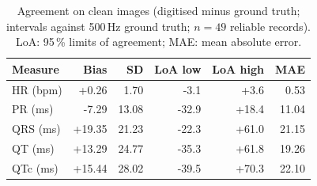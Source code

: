 \begin{table}[ht]
\centering\small
\caption{Agreement on clean images (digitised minus ground truth; intervals against 500\,Hz ground truth; $n=49$ reliable records). LoA: 95\,\% limits of agreement; MAE: mean absolute error.}\label{tab:ba}
\begin{tabular}{@{}lrrrrr@{}}
\toprule
Measure & Bias & SD & LoA low & LoA high & MAE \\
\midrule
HR (bpm) & +0.26 & 1.70 & -3.1 & +3.6 & 0.53 \\
PR (ms) & -7.29 & 13.08 & -32.9 & +18.4 & 11.04 \\
QRS (ms) & +19.35 & 21.23 & -22.3 & +61.0 & 21.15 \\
QT (ms) & +13.29 & 24.77 & -35.3 & +61.8 & 19.26 \\
QTc (ms) & +15.44 & 28.02 & -39.5 & +70.3 & 22.10 \\
\bottomrule
\end{tabular}
\end{table}